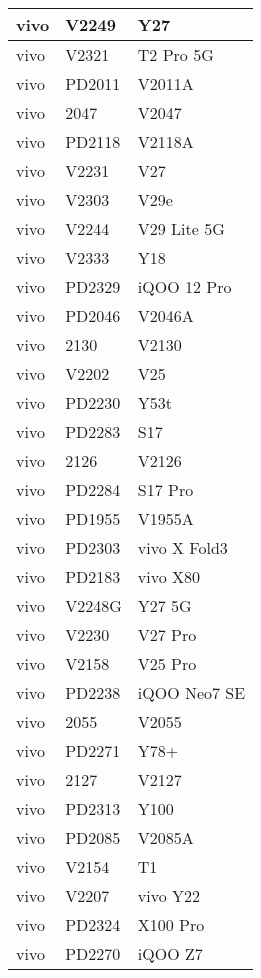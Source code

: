 \begin{tabularx}{\linewidth}{|l|X|X|}
        vivo & V2249 & Y27 \\ \hline
        vivo & V2321 & T2 Pro 5G \\ \hline
        vivo & PD2011 & V2011A \\ \hline
        vivo & 2047 & V2047 \\ \hline
        vivo & PD2118 & V2118A \\ \hline
        vivo & V2231 & V27 \\ \hline
        vivo & V2303 & V29e \\ \hline
        vivo & V2244 & V29 Lite 5G \\ \hline
        vivo & V2333 & Y18 \\ \hline
        vivo & PD2329 & iQOO 12 Pro \\ \hline
        vivo & PD2046 & V2046A \\ \hline
        vivo & 2130 & V2130 \\ \hline
        vivo & V2202 & V25 \\ \hline
        vivo & PD2230 & Y53t \\ \hline
        vivo & PD2283 & S17 \\ \hline
        vivo & 2126 & V2126 \\ \hline
        vivo & PD2284 & S17 Pro \\ \hline
        vivo & PD1955 & V1955A \\ \hline
        vivo & PD2303 & vivo X Fold3 \\ \hline
        vivo & PD2183 & vivo X80 \\ \hline
        vivo & V2248G & Y27 5G \\ \hline
        vivo & V2230 & V27 Pro \\ \hline
        vivo & V2158 & V25 Pro \\ \hline
        vivo & PD2238 & iQOO Neo7 SE \\ \hline
        vivo & 2055 & V2055 \\ \hline
        vivo & PD2271 & Y78+ \\ \hline
        vivo & 2127 & V2127 \\ \hline
        vivo & PD2313 & Y100 \\ \hline
        vivo & PD2085 & V2085A \\ \hline
        vivo & V2154 & T1 \\ \hline
        vivo & V2207 & vivo Y22 \\ \hline
        vivo & PD2324 & X100 Pro \\ \hline
        vivo & PD2270 & iQOO Z7 \\ \hline

\end{tabularx}
